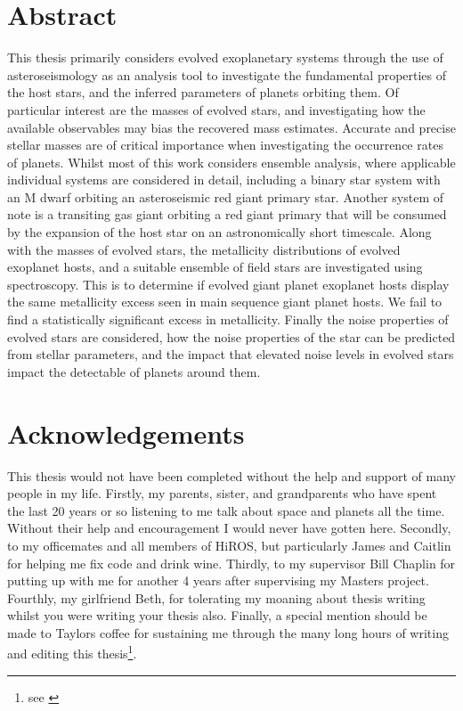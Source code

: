 \chapter*{Abstract}
This thesis primarily considers evolved exoplanetary systems through the use of asteroseismology as an analysis tool to investigate the fundamental properties of the host stars, and the inferred parameters of  planets orbiting them. Of particular interest are the masses of evolved stars, and investigating how the available observables may bias the recovered mass estimates. Accurate and precise stellar masses are of critical importance when investigating the occurrence rates of planets. Whilst most of this work considers ensemble analysis, where applicable individual systems are considered in detail, including a binary star system with an M dwarf orbiting an asteroseismic red giant primary star. Another system of note is a transiting gas giant orbiting a red giant primary that will be consumed by the expansion of the host star on an astronomically short timescale. Along with the masses of evolved stars, the metallicity distributions of evolved exoplanet hosts, and a suitable ensemble of field stars are investigated using spectroscopy. This is to determine if evolved giant planet exoplanet hosts display the same metallicity excess seen in main sequence giant planet hosts. We fail to find a statistically significant excess in metallicity. Finally the noise properties of evolved stars are considered, how the noise properties of the star can be predicted from stellar parameters, and the impact that elevated noise levels in evolved stars impact the detectable of planets around them. 

\thispagestyle{plain}

\chapter*{Acknowledgements}
This thesis would not have been completed without the help and support of many people in my life. Firstly, my parents, sister, and grandparents who have spent the last 20 years or so listening to me talk about space and planets all the time. Without their help and encouragement I would never have gotten here. Secondly, to my officemates and all members of HiROS, but particularly James and Caitlin for helping me fix code and drink wine. Thirdly, to my supervisor Bill Chaplin for putting up with me for another 4 years after supervising my Masters project. Fourthly, my  girlfriend Beth, for tolerating my moaning about thesis writing whilst you were writing your thesis also. Finally, a special mention should be made to Taylors coffee for sustaining me through the many long hours of writing and editing this thesis\footnote{see \cite{writerblock}}.
\thispagestyle{plain}